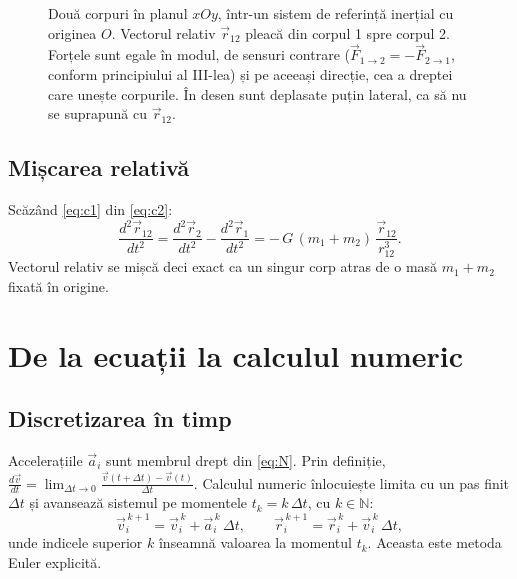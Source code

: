 \documentclass[11pt,a4paper]{article}
\newcommand{\vr}{\vec r}
\newcommand{\vv}{\vec v}
\newcommand{\va}{\vec a}
\newcommand{\od}[1]{\frac{d #1}{d t}}
\newcommand{\odd}[1]{\frac{d^{2} #1}{d t^{2}}}
\begin{document}
\begin{figure}[H]
\centering
{}
\caption{Două corpuri în planul $xOy$, într-un sistem de referință inerțial cu originea $O$. Vectorul relativ $\vr_{12}$ pleacă din corpul 1 spre corpul 2. Forțele sunt egale în modul, de sensuri contrare ($\vec F_{1\to 2} = -\vec F_{2\to 1}$, conform principiului al III-lea) și pe aceeași direcție, cea a dreptei care unește corpurile. În desen sunt deplasate puțin lateral, ca să nu se suprapună cu $\vr_{12}$.}
\label{fig:inertial}
\end{figure}

\subsection*{Mișcarea relativă}
Scăzând \eqref{eq:c1} din \eqref{eq:c2}:
\begin{equation}
  \odd{\vr_{12}} = \odd{\vr_2} - \odd{\vr_1} = -\,G\,(m_1+m_2)\,\frac{\vr_{12}}{r_{12}^{3}}. \label{eq:rel}
\end{equation}
Vectorul relativ se mișcă deci exact ca un singur corp atras de o masă $m_1 + m_2$ fixată în origine.

\section{De la ecuații la calculul numeric}\label{sec:numeric}

\subsection*{Discretizarea în timp}
Accelerațiile $\va_i$ sunt membrul drept din \eqref{eq:N}. Prin definiție, $\od{\vv} = \lim_{\Delta t\to 0} \frac{\vv(t+\Delta t) - \vv(t)}{\Delta t}$. Calculul numeric înlocuiește limita cu un pas finit $\Delta t$ și avansează sistemul pe momentele $t_k = k\,\Delta t$, cu $k \in \mathbb{N}$:
\begin{equation}
  \vv_i^{\,k+1} = \vv_i^{\,k} + \va_i^{\,k}\,\Delta t, \qquad
  \vr_i^{\,k+1} = \vr_i^{\,k} + \vv_i^{\,k}\,\Delta t, \label{eq:euler}
\end{equation}
unde indicele superior $k$ înseamnă valoarea la momentul $t_k$. Aceasta este metoda Euler explicită.
\end{document}
